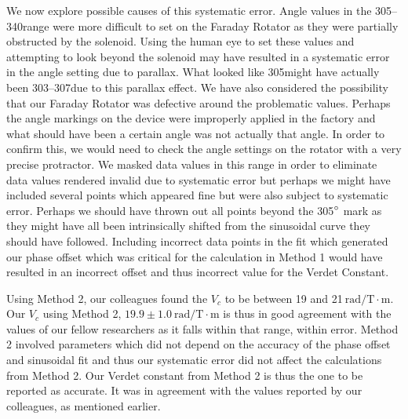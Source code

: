 \documentclass[prb,preprint]{revtex4-1}
\begin{document}
{{We now explore possible causes of this systematic error.  Angle values in the 305\degree--340\degree range were more difficult to set on the Faraday Rotator as they were partially obstructed by the solenoid.  Using the human eye to set these values and attempting to look beyond the solenoid may have resulted in a systematic error in the angle setting due to parallax.  What looked like 305\degree might have actually been 303\degree--307\degree due to this parallax effect. We have also considered the possibility that our Faraday Rotator was defective around the problematic values.  Perhaps the angle markings on the device were improperly applied in the factory and what should have been a certain angle was not actually that angle.  In order to confirm this, we would need to check the angle settings on the rotator with a very precise protractor.  We masked data values in this range in order to eliminate data values rendered invalid due to systematic error but perhaps we might have included several points which appeared fine but were also subject to systematic error.  Perhaps we should have thrown out all points beyond the 305$\degree$ mark as they might have all been intrinsically shifted from the sinusoidal curve they should have followed.  Including incorrect data points in the fit which generated our phase offset which was critical for the calculation in Method 1 would have resulted in an incorrect offset and thus incorrect value for the Verdet Constant.

Using Method 2, our colleagues found the $V_{c}$ to be between 19 and 21$\mathrm{~rad/T} \cdot \textrm{m}$.  Our $V_{c}$ using Method 2, $19.9 \pm 1.0 \mathrm{~rad/T} \cdot \textrm{m}$ is thus in good agreement with the values of our fellow researchers as it falls within that range, within error. Method 2 involved parameters which did not depend on the accuracy of the phase offset and sinusoidal fit and thus our systematic error did not affect the calculations from Method 2.  Our Verdet constant from Method 2 is thus the one to be reported as accurate.  It was in agreement with the values reported by our colleagues, as mentioned earlier.}

}
\end{document}
